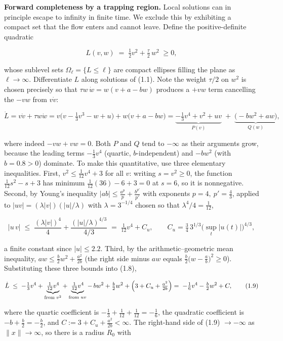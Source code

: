 \documentclass[
  11pt,
]{article}
\providecommand{\lt}{<}
\providecommand{\gt}{>}
\begin{document}
\textbf{Forward completeness by a trapping region.} Local solutions can
in principle escape to infinity in finite time. We exclude this by
exhibiting a compact set that the flow enters and cannot leave. Define
the positive-definite quadratic

\[
L(v,w)\;=\;\tfrac12 v^{2}+\tfrac{\tau}{2}\,w^{2}\;\ge 0,
\tag{1.7}
\]

whose sublevel sets \(\Omega_\ell=\{L\le \ell\}\) are compact ellipses
filling the plane as \(\ell\to\infty\). Differentiate \(L\) along
solutions of (1.1). Note the weight \(\tau/2\) on \(w^2\) is chosen
precisely so that \(\tau w\,\dot w=w(v+a-bw)\) produces a \(+vw\) term
cancelling the \(-vw\) from \(v\dot v\):

\[
\dot L=v\dot v+\tau w\dot w
= v\bigl(v-\tfrac13 v^3-w+u\bigr)+w\bigl(v+a-bw\bigr)
= \underbrace{-\tfrac13 v^4+v^2+uv}_{P(v)}\;+\;\underbrace{\bigl(-b w^2+a w\bigr)}_{Q(w)} ,
\tag{1.8}
\]

where indeed \(-vw+vw=0\). Both \(P\) and \(Q\) tend to \(-\infty\) as
their arguments grow, because the leading terms \(-\tfrac13 v^4\)
(quartic, \(b\)-independent) and \(-b w^2\) (with \(b=0.8\gt 0\))
dominate. To make this quantitative, use three elementary inequalities.
First, \(v^2\le \tfrac1{12}v^4+3\) for all \(v\): writing
\(s=v^2\ge 0\), the function \(\tfrac1{12}s^2-s+3\) has minimum
\(\tfrac1{12}(36)-6+3=0\) at \(s=6\), so it is nonnegative. Second, by
Young's inequality \(|ab|\le \tfrac{a^p}{p}+\tfrac{b^{p'}}{p'}\) with
exponents \(p=4,\ p'=\tfrac43\), applied to
\(|uv|=(\lambda|v|)(|u|/\lambda)\) with \(\lambda=3^{-1/4}\) chosen so
that \(\lambda^4/4=\tfrac1{12}\),

\[
|u\,v|\;\le\;\frac{(\lambda|v|)^4}{4}+\frac{(|u|/\lambda)^{4/3}}{4/3}
\;=\;\tfrac{1}{12}v^{4}+C_u,\qquad C_u=\tfrac34\,3^{1/3}\bigl(\sup_t|u(t)|\bigr)^{4/3},
\]

a finite constant since \(|u|\le 2.2\). Third, by the
arithmetic--geometric mean inequality,
\(a w\le \tfrac{b}{2}w^2+\tfrac{a^2}{2b}\) (the right side minus \(aw\)
equals \(\tfrac{b}{2}\bigl(w-\tfrac{a}{b}\bigr)^2\ge 0\)). Substituting
these three bounds into (1.8),

\[
\dot L\;\le\;-\tfrac13 v^4+\underbrace{\tfrac1{12}v^4}_{\text{from }v^2}+\underbrace{\tfrac1{12}v^4}_{\text{from }uv}
-\,b w^2+\tfrac{b}{2}w^2+\Bigl(3+C_u+\tfrac{a^2}{2b}\Bigr)
=\;-\tfrac16 v^4-\tfrac{b}{2}w^2+C,
\tag{1.9}
\]

where the quartic coefficient is
\(-\tfrac13+\tfrac1{12}+\tfrac1{12}=-\tfrac16\), the quadratic
coefficient is \(-b+\tfrac{b}{2}=-\tfrac{b}{2}\), and
\(C:=3+C_u+\tfrac{a^2}{2b}\lt \infty\). The right-hand side of (1.9)
\(\to-\infty\) as \(\|x\|\to\infty\), so there is a radius \(R_0\) with
\end{document}
